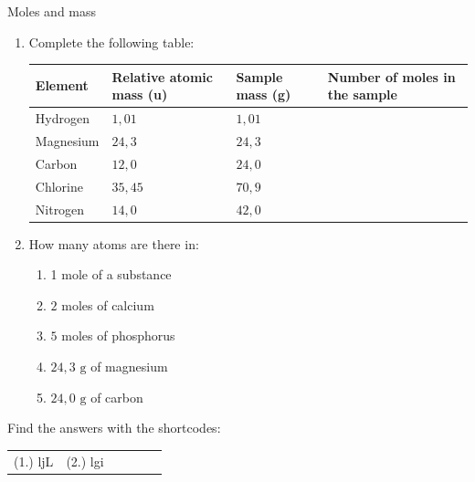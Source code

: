 	\par
{}
\label{m38717*secfhsst!!!underscore!!!id127}
            \begin{exercises}{Moles and mass
      }
            \nopagebreak
      \label{m38717*id276067}\begin{enumerate}[noitemsep, label=\textbf{\arabic*}. ] 
            \label{m38717*uid2}\item 
Complete the following table:
          \begin{table}[H]
        \begin{center}
      \label{m38717*id276082}
    \noindent
      \begin{tabular}{|l|l|l|l|}\hline
\textbf{Element} & \textbf{Relative atomic mass (u)} & \textbf{Sample mass (g)} & \textbf{Number of moles in the sample} \\ \hline
        Hydrogen & $1,01$ & $1,01$ & \\ \hline
        Magnesium & $24,3$ & $24,3$ & \\ \hline
        Carbon & $12,0$ & $24,0$ & \\ \hline
        Chlorine & $35,45$ & $70,9$ & \\ \hline
        Nitrogen & $14,0$ & $42,0$ & \\ \hline
    \end{tabular}
      \end{center}
\end{table}
    \par
         \label{m38717*uid3}\item 
How many atoms are there in:
\label{m38717*id276311}\begin{enumerate}[noitemsep, label=\textbf{\alph*}. ] 
            \label{m38717*uid4}\item 1 mole of a substance
\label{m38717*uid5}\item $2$ moles of calcium
\label{m38717*uid6}\item $5$ moles of phosphorus
\label{m38717*uid7}\item $24,3 \text{ g}$ of magnesium
\label{m38717*uid8}\item $24,0 \text{ g}$ of carbon
\end{enumerate}
                \end{enumerate}
\practiceinfo
\par {} Find the answers with the shortcodes:
 \par \begin{tabular}[h]{cccccc}
 (1.) ljL  &  (2.) lgi  & \end{tabular}
\end{exercises}
